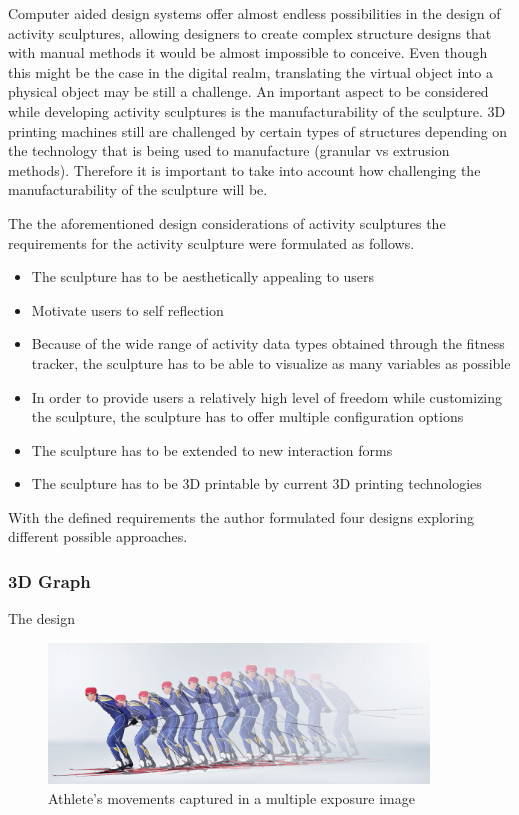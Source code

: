 \documentclass[../medieninformatik-arbeit.tex]{subfiles}
\begin{document}
Computer aided design systems offer almost endless possibilities in the design of activity sculptures, allowing designers to create complex structure designs that with manual methods it would be almost impossible to conceive.  Even though this might be the case in the digital realm, translating the virtual object into a physical object may be still a challenge. An important aspect to be considered while developing activity sculptures is the manufacturability of the sculpture\cite{swaminathan2014supporting}. 3D printing machines still are challenged by certain types of structures depending on the technology that is being used to manufacture (granular vs extrusion methods). Therefore it is important to take into account how challenging the manufacturability of the sculpture will be.

The the aforementioned design considerations of activity sculptures the requirements for the activity sculpture were formulated as follows. 

\begin{itemize}
	\item The sculpture has to be aesthetically appealing to users
	\item Motivate users to self reflection
	\item Because of the wide range of activity data types obtained through the fitness tracker, the sculpture has to be able to visualize as many variables as possible
	\item In order to provide users a relatively high level of freedom while customizing the sculpture, the sculpture has to offer multiple configuration options
	\item The sculpture has to be extended to new interaction forms
	\item The sculpture has to be 3D printable by current 3D printing technologies
\end{itemize}

With the defined requirements the author formulated four designs exploring different possible approaches.  

\subsubsection{3D Graph}
The design 



\begin{figure}[h]
\captionsetup{width=0.9\textwidth}
\begin{center}
  \includegraphics[width=0.9\textwidth]{Prototype/img/multiexposure}
  \caption{Athlete's movements captured in a multiple exposure image\cite{multiexposure}}
\label{fig:multiexposure}
\end{center}
\end{figure}
\end{document}
